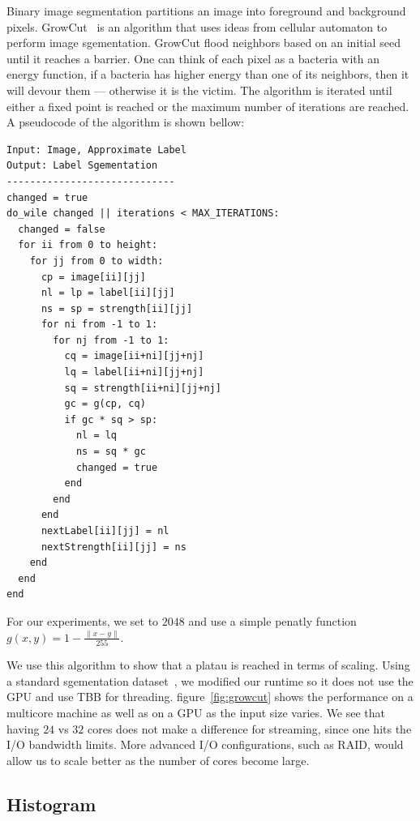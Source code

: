 Binary image segmentation partitions an image into foreground and background
  pixels.
GrowCut~\cite{vezhnevets2005growcut} is an algorithm that uses ideas from cellular automaton to perform image
  sgementation.
GrowCut flood
  neighbors based on an initial seed until it reaches a barrier.
One can think of each pixel as a bacteria with an energy function, if a bacteria has
  higher energy than one of its neighbors, then it will devour them --- otherwise it
  is the victim.
The algorithm is iterated until either a fixed point is reached or the maximum number
  of iterations are reached.
A pseudocode of the algorithm is shown bellow:


\begin{lstlisting}
Input: Image, Approximate Label
Output: Label Sgementation
-----------------------------
changed = true
do_wile changed || iterations < MAX_ITERATIONS:
  changed = false
  for ii from 0 to height:
    for jj from 0 to width:
      cp = image[ii][jj]
      nl = lp = label[ii][jj]
      ns = sp = strength[ii][jj]
      for ni from -1 to 1:
        for nj from -1 to 1:
          cq = image[ii+ni][jj+nj]
          lq = label[ii+ni][jj+nj]
          sq = strength[ii+ni][jj+nj]
          gc = g(cp, cq)
          if gc * sq > sp:
            nl = lq
            ns = sq * gc
            changed = true
          end
        end
      end
      nextLabel[ii][jj] = nl
      nextStrength[ii][jj] = ns
    end
  end
end
\end{lstlisting}

For our experiments, we set  to $2048$ and use a
  simple penatly function $g(x,y)  = 1 - \frac{\|x - y\|}{255}$.

We use this algorithm to show that a platau is reached in terms of scaling.
Using a standard sgementation dataset~\cite{gridcut}, we modified our runtime so
  it does not use the GPU and use TBB for threading. figure~\ref{fig:growcut} shows the
  performance on a multicore machine as well as on a GPU as the input
  size varies.
We see that having $24$ vs $32$ cores does not make a difference for streaming, since
  one hits the I/O bandwidth limits.
More advanced I/O configurations, such as RAID, would allow us to scale better as the number of cores become large. 

\subsection{Histogram}

